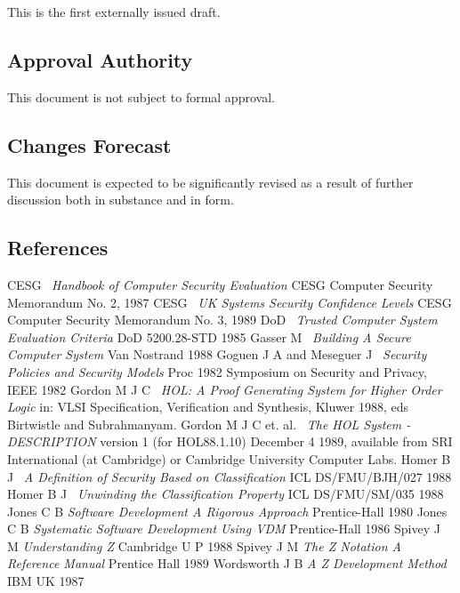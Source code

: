 This is the first externally issued draft.

\subsection{Approval Authority}
This document is not subject to formal approval.

\subsection{Changes Forecast}

This document is expected to be significantly revised as a result of further discussion both in substance and in form.

\subsection{References}
\begin{thebibliography}{99}
 CESG  \ {\em Handbook of Computer Security Evaluation} CESG Computer Security Memorandum No. 2, 1987
 CESG  \ {\em UK Systems Security Confidence Levels}  CESG Computer Security Memorandum No. 3, 1989
 DoD \ {\em Trusted Computer System Evaluation Criteria} DoD 5200.28-STD 1985
 Gasser M  \ {\em Building A Secure Computer System}  Van Nostrand 1988
 Goguen J A and Meseguer J \ {\em Security Policies and Security Models} Proc 1982 Symposium on Security and Privacy, IEEE 1982
 Gordon M J C \ {\em HOL: A Proof Generating System for Higher Order Logic} in: VLSI Specification, Verification and Synthesis, Kluwer 1988, eds Birtwistle and Subrahmanyam.
 Gordon M J C et. al. \ {\em The HOL System - DESCRIPTION} version 1 (for HOL88.1.10) December 4 1989, available from SRI International (at Cambridge) or Cambridge University Computer Labs.
  Homer B J \ {\em A Definition of Security Based on Classification}  ICL DS/FMU/BJH/027 1988
 Homer B J \ {\em Unwinding the Classification Property} ICL DS/FMU/SM/035 1988
 Jones C B {\em Software Development A Rigorous Approach} Prentice-Hall 1980
 Jones C B {\em Systematic Software Development Using VDM} Prentice-Hall 1986
 Spivey J M {\em Understanding Z} Cambridge U P 1988
 Spivey J M {\em The Z Notation A Reference Manual} Prentice Hall 1989
 Wordsworth J B {\em A Z Development Method} IBM UK 1987
\end{thebibliography}

